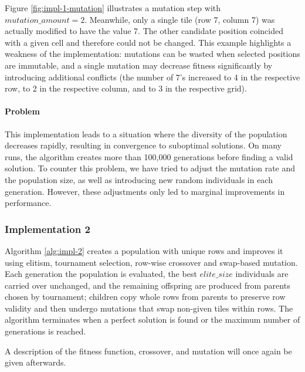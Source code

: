 Figure \ref{fig:impl-1-mutation} illustrates a mutation step with $mutation\_amount =2$. Meanwhile, only a single tile (row 7, column 7) was actually modified to have the value 7. The other candidate position coincided with a given cell and therefore could not be changed. This example highlights a weakness of the implementation: mutations can be wasted when selected positions are immutable, and a single mutation may decrease fitness significantly by introducing additional conflicts (the number of 7's increased to 4 in the respective row, to 2 in the respective column, and to 3 in the respective grid).

\paragraph{Problem}
This implementation leads to a situation where the diversity of the population decreases rapidly, resulting in convergence to suboptimal solutions. On many runs, the algorithm creates more than 100,000 generations before finding a valid solution.  
To counter this problem, we have tried to adjust the mutation rate and the population size, as well as introducing new random individuals in each generation. However, these adjustments only led to marginal improvements in performance.

\subsubsection{Implementation 2}
Algorithm \ref{alg:impl-2} creates a population with unique rows and improves it using elitism, tournament selection, row-wise crossover and swap-based mutation. Each generation the population is evaluated, the best \(elite\_size\) individuals are carried over unchanged, and the remaining offspring are produced from parents chosen by tournament; children copy whole rows from parents to preserve row validity and then undergo mutations that swap non-given tiles within rows. The algorithm terminates when a perfect solution is found or the maximum number of generations is reached.

A description of the fitness function, crossover, and mutation will once again be given afterwards.

